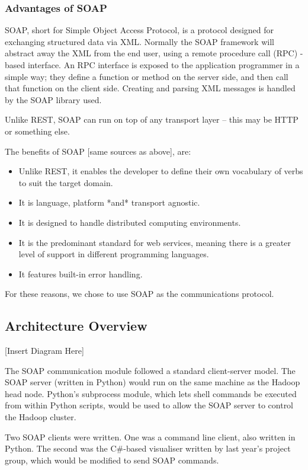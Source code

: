 \subsubsection{Advantages of SOAP}

SOAP, short for Simple Object Access Protocol, is a protocol designed for exchanging structured data via XML. Normally the SOAP framework will abstract away the XML from the end user, using a remote procedure call (RPC) -based interface. An RPC interface is exposed to the application programmer in a simple way; they define a function or method on the server side, and then call that function on the client side. Creating and parsing XML messages is handled by the SOAP library used.

Unlike REST, SOAP can run on top of any transport layer -- this may be HTTP or something else.

The benefits of SOAP [same sources as above], are:
\begin{itemize}
\item Unlike REST, it enables the developer to define their own vocabulary of
verbs to suit the target domain.
\item It is language, platform *and* transport agnostic.
\item It is designed to handle distributed computing environments.
\item It is the predominant standard for web services, meaning there is a
greater level of support in different programming languages.
\item It features built-in error handling.
\end{itemize}

For these reasons, we chose to use SOAP as the communications protocol.

\subsection{Architecture Overview}

[Insert Diagram Here]

The SOAP communication module followed a standard client-server model. The SOAP server (written in Python) would run on the same machine as the Hadoop head node. Python's subprocess module, which lets shell commands be executed from within Python scripts, would be used to allow the SOAP server to control the Hadoop cluster.

Two SOAP clients were written. One was a command line client, also written in Python. The second was the C\#-based visualiser written by last year's project group, which would be modified to send SOAP commands.


